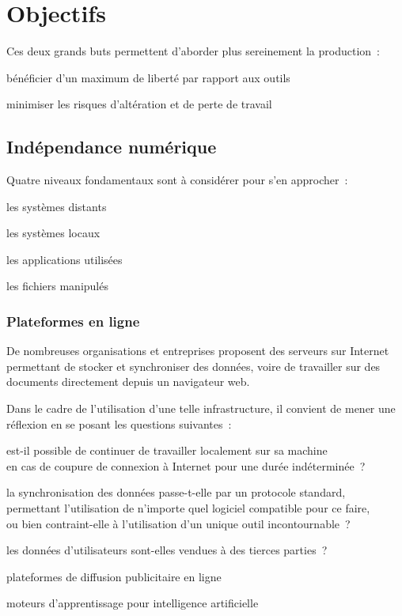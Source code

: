 \section{Objectifs}

Ces deux grands buts permettent d’aborder plus sereinement la production :
\begin{enum}
\item{bénéficier d’un maximum de liberté par rapport aux outils}
\item{minimiser les risques d’altération et de perte de travail}
\end{enum}

\hr

\subsection{Indépendance numérique}

Quatre niveaux fondamentaux sont à considérer pour s’en approcher :
\begin{enum}
\item{les systèmes distants}
\item{les systèmes locaux}
\item{les applications utilisées}
\item{les fichiers manipulés}
\end{enum}

\subsubsection{Plateformes en ligne}

De nombreuses organisations et entreprises proposent des serveurs sur Internet
permettant de stocker et synchroniser des données, voire de travailler sur des
documents directement depuis un navigateur web.

Dans le cadre de l’utilisation d’une telle infrastructure,
il convient de mener une réflexion en se posant les questions suivantes :
\begin{itmz}
\item{est-il possible de continuer de travailler localement sur sa machine\\
en cas de coupure de connexion à Internet pour une durée indéterminée ?}
\item{la synchronisation des données passe-t-elle par un protocole standard,\\
permettant l’utilisation de n’importe quel logiciel compatible pour ce faire,\\
ou bien contraint-elle à l’utilisation d’un unique outil incontournable ?}
\item{les données d’utilisateurs sont-elles vendues à des tierces parties ?
    \begin{itmz}
    \item{plateformes de diffusion publicitaire en ligne}
    \item{moteurs d’apprentissage pour intelligence artificielle}
    \end{itmz}
}
\end{itmz}

